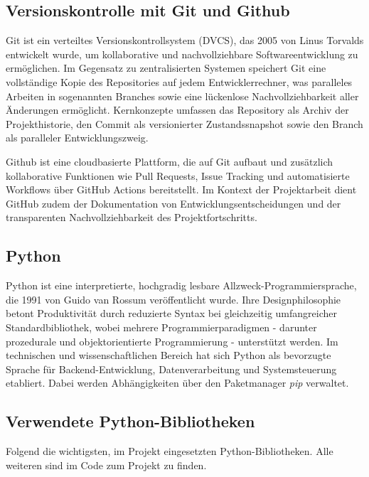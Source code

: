 \subsection{Versionskontrolle mit Git und Github}
\label{subsec:Softwarearchitektur}
Git ist ein verteiltes Versionskontrollsystem (DVCS), das 2005 von Linus Torvalds entwickelt wurde, um kollaborative und nachvollziehbare Softwareentwicklung zu ermöglichen. Im Gegensatz zu zentralisierten Systemen speichert Git eine vollständige Kopie des Repositories auf jedem Entwicklerrechner, was paralleles Arbeiten in sogenannten Branches sowie eine lückenlose Nachvollziehbarkeit aller Änderungen ermöglicht. Kernkonzepte umfassen das Repository als Archiv der Projekthistorie, den Commit als versionierter Zustandssnapshot sowie den Branch als paralleler Entwicklungszweig.\autocite[vgl. S.10ff]{chaconProGit2014}

Github ist eine cloudbasierte Plattform, die auf Git aufbaut und zusätzlich kollaborative Funktionen wie Pull Requests, Issue Tracking und automatisierte Workflows über GitHub Actions bereitstellt. Im Kontext der Projektarbeit dient GitHub zudem der Dokumentation von Entwicklungsentscheidungen und der transparenten Nachvollziehbarkeit des Projektfortschritts.\autocite[vgl. verschiedene Seiten]{GitHubComHilfeDokumentation}

\newpage

\subsection{Python}
\label{subsec:Python}
Python ist eine interpretierte, hochgradig lesbare Allzweck-Programmiersprache, die 1991 von Guido van Rossum veröffentlicht wurde. Ihre Designphilosophie betont Produktivität durch reduzierte Syntax bei gleichzeitig umfangreicher Standardbibliothek, wobei mehrere Programmierparadigmen - darunter prozedurale und objektorientierte Programmierung - unterstützt werden. Im technischen und wissenschaftlichen Bereich hat sich Python als bevorzugte Sprache für Backend-Entwicklung, Datenverarbeitung und Systemsteuerung etabliert.\autocite[vgl.]{PythonLanguageReference}
Dabei werden Abhängigkeiten  über den Paketmanager \textit{pip} verwaltet.\autocite[vgl.]{PipDocumentationV2601}

\subsection{Verwendete Python-Bibliotheken}
\label{subsec:PythonLibraries}
Folgend die wichtigsten, im Projekt eingesetzten Python-Bibliotheken. Alle weiteren sind im Code zum Projekt zu finden.


